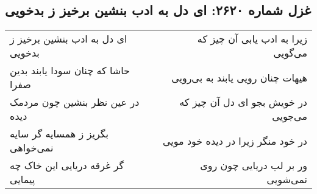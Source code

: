 \begin{center}
\section*{غزل شماره ۲۶۲۰: ای دل به ادب بنشین برخیز ز بدخویی}
\label{sec:2620}
\begin{longtable}{l p{0.5cm} r}
ای دل به ادب بنشین برخیز ز بدخویی
&&
زیرا به ادب یابی آن چیز که می‌گویی
\\
حاشا که چنان سودا یابند بدین صفرا
&&
هیهات چنان رویی یابند به بی‌رویی
\\
در عین نظر بنشین چون مردمک دیده
&&
در خویش بجو ای دل آن چیز که می‌جویی
\\
بگریز ز همسایه گر سایه نمی‌خواهی
&&
در خود منگر زیرا در دیده خود مویی
\\
گر غرقه دریایی این خاک چه پیمایی
&&
ور بر لب دریایی چون روی نمی‌شویی
\\
\end{longtable}
\end{center}
